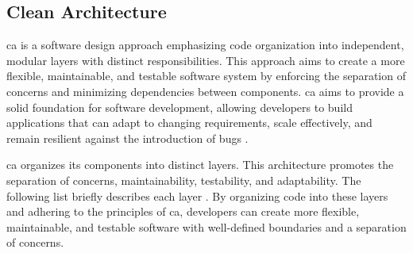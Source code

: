 \subsection{Clean Architecture} \label{sec_clean_architecture}
\gls{ca} is a software design approach emphasizing code organization into independent,
modular layers with distinct responsibilities. This approach aims to create a more
flexible, maintainable, and testable software system by enforcing the separation of
concerns and minimizing dependencies between components. \gls{ca} aims to provide a solid
foundation for software development, allowing developers to build applications that can
adapt to changing requirements, scale effectively, and remain resilient against the
introduction of bugs \parencite{r_c_martin_clean_2018}.

\gls{ca} organizes its components into distinct layers. This architecture promotes the
separation of concerns, maintainability, testability, and adaptability. The following list
briefly describes each layer \parencite{r_c_martin_clean_2018}. By organizing code into
these layers and adhering to the principles of \gls{ca}, developers can create more
flexible, maintainable, and testable software with well-defined boundaries and a
separation of concerns.

